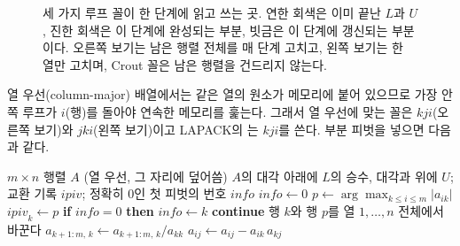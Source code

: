 \begin{figure}[t]
\centering
{}
\caption{세 가지 루프 꼴이 한 단계에 읽고 쓰는 곳. 연한 회색은 이미 끝난 $L$과 $U$, 진한 회색은 이 단계에 완성되는 부분, 빗금은 이 단계에 갱신되는 부분이다. 오른쪽 보기는 남은 행렬 전체를 매 단계 고치고, 왼쪽 보기는 한 열만 고치며, Crout 꼴은 남은 행렬을 건드리지 않는다.}
\label{fig:lu-looking}
\end{figure}

열 우선(column-major) 배열에서는 같은 열의 원소가 메모리에 붙어 있으므로 가장 안쪽 루프가 $i$(행)를 돌아야 연속한 메모리를 훑는다. 그래서 열 우선에 맞는 꼴은 $kji$(오른쪽 보기)와 $jki$(왼쪽 보기)이고 LAPACK의 는 $kji$를 쓴다. 부분 피벗을 넣으면 다음과 같다.

\begin{algorithm}[t]
\begin{algorithmic}[1]
\Require $m\times n$ 행렬 $A$ (열 우선, 그 자리에 덮어씀)
\Ensure $A$의 대각 아래에 $L$의 승수, 대각과 위에 $U$; 교환 기록 $\mathit{ipiv}$; 정확히 $0$인 첫 피벗의 번호 $\mathit{info}$
\State $\mathit{info}\gets0$
  \State $p\gets\arg\max_{k\le i\le m}|a_{ik}|$ 
  \State $\mathit{ipiv}_k\gets p$
    \State \textbf{if} $\mathit{info}=0$ \textbf{then} $\mathit{info}\gets k$ 
    \State \textbf{continue}
  \EndIf
  \State 행 $k$와 행 $p$를 열 $1,\dots,n$ 전체에서 바꾼다
  \State $a_{k+1:m,\,k}\gets a_{k+1:m,\,k}/a_{kk}$ 
   
      \State $a_{ij}\gets a_{ij}-a_{ik}\,a_{kj}$
    \EndFor
  \EndFor
\EndFor
\end{algorithmic}
\caption{부분 피벗을 쓰는 오른쪽 보기 LU ($kji$ 꼴, LAPACK 의 산술)}
\label{alg:lu-right}
\end{algorithm}

